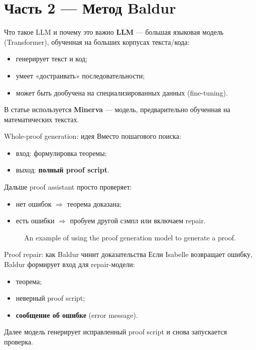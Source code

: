 \section{Часть 2 — Метод Baldur}

\begin{frame}{Что такое LLM и почему это важно}
\textbf{LLM} — большая языковая модель (Transformer), обученная на больших корпусах текста/кода:
\begin{itemize}
  \item генерирует текст и код;
  \item умеет «достраивать» последовательности;
  \item может быть дообучена на специализированных данных (fine-tuning).
\end{itemize}

\vspace{2mm}
В статье используется \textbf{Minerva} — модель, предварительно обученная на математических текстах.
\end{frame}

\begin{frame}{Whole-proof generation: идея}
Вместо пошагового поиска:
\begin{itemize}
  \item вход: формулировка теоремы;
  \item выход: \textbf{полный proof script}.
\end{itemize}

\vspace{2mm}
Дальше proof assistant просто проверяет:
\begin{itemize}
  \item нет ошибок $\Rightarrow$ теорема доказана;
  \item есть ошибки $\Rightarrow$ пробуем другой сэмпл или включаем repair.
\end{itemize}
\end{frame}


\begin{figure}{}
\centering

\caption{An example of using the proof generation model to generate a proof.}
\end{figure}

\begin{frame}{Proof repair: как Baldur чинит доказательства}
Если Isabelle возвращает ошибку, Baldur формирует вход для repair-модели:
\begin{itemize}
  \item теорема;
  \item неверный proof script;
  \item \textbf{сообщение об ошибке} (error message).
\end{itemize}

\vspace{2mm}
Далее модель генерирует исправленный proof script и снова запускается проверка.
\end{frame}

